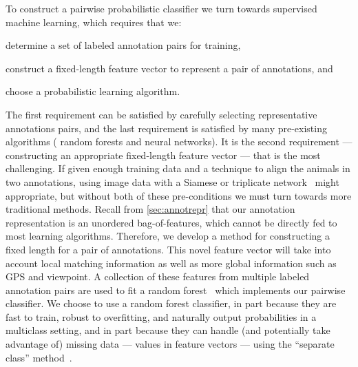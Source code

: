 \MatchStateExample{}

To construct a pairwise probabilistic classifier we turn towards supervised machine learning, which requires that
  we:
\begin{enumin}

    \item determine a set of labeled annotation pairs for training, 

    \item construct a fixed-length feature vector to represent a pair of annotations,  and

    \item choose a probabilistic learning algorithm.
\end{enumin}
The first requirement can be satisfied by carefully selecting representative annotations pairs, and the last
  requirement is satisfied by many pre-existing algorithms (\eg{} random forests and neural networks).
It is the second requirement --- constructing an appropriate fixed-length feature vector --- that is the most
  challenging.
If given enough training data and a technique to align the animals in two annotations, using image data with a
  Siamese or triplicate network~\cite{taigman_deepface_2014,schroff_facenet_2015} might appropriate, but without
  both of these pre-conditions we must turn towards more traditional methods.
Recall from \cref{sec:annotrepr} that our annotation representation is an unordered bag-of-features, which cannot
  be directly fed to most learning algorithms.
Therefore, we develop a method for constructing a fixed length  for a pair of
  annotations.
This novel feature vector will take into account local matching information as well as more global information
  such as GPS and viewpoint.
A collection of these features from multiple labeled annotation pairs are used to fit a random
  forest~\cite{breiman_random_2001} which implements our pairwise classifier.
We choose to use a random forest classifier, in part because they are fast to train, robust to overfitting, and
  naturally output probabilities in a multiclass setting, and in part because they can handle (and potentially take
  advantage of) missing data --- \ie{} \nan{} values in feature vectors --- using the ``separate class''
  method~\cite{ding_investigation_2010}.
  

